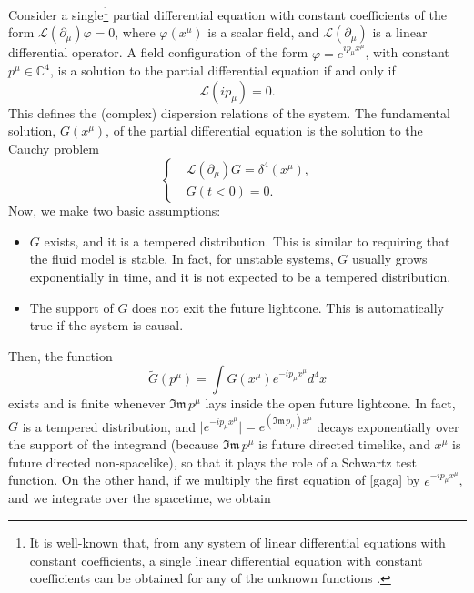 \documentclass[a4paper, amsfonts, amssymb, amsmath, reprint, showkeys, nofootinbib, twoside,notitlepage]{revtex4-1}
\theoremstyle{definition}
\theoremstyle{theorem}
\theoremstyle{corollary}
\begin{document}
Consider a single\footnote{It is well-known that, from any system of linear differential equations with
constant coefficients, a single linear differential equation with constant coefficients can be obtained for any of the unknown functions \cite{CourantHilbert2_book}.} partial differential equation with constant coefficients of the form $\mathcal{L}(\partial_\mu)\varphi=0$, where $\varphi(x^\mu)$ is a scalar field, and $\mathcal{L}(\partial_\mu)$ is a linear differential operator. A field configuration of the form $\varphi=e^{ip_\mu x^\mu}$, with constant $p^\mu \in \mathbb{C}^4$, is a solution to the partial differential equation if and only if
\begin{equation}
\mathcal{L}(ip_\mu)=0.
\end{equation}
This defines the (complex) dispersion relations of the system. The fundamental solution, $G(x^\mu)$, of the partial differential equation is the solution to the Cauchy problem
\begin{equation}\label{gaga}
\left\{ \begin{aligned} 
  & \mathcal{L}(\partial_\mu)G = \delta^4(x^\mu)  , \\
  & G(t<0) = 0 .
\end{aligned} \right.
\end{equation}
Now, we make two basic assumptions:
\begin{itemize}
\item[(a)] $G$ exists, and it is a tempered distribution. This is similar to requiring that the fluid model is stable. In fact, for unstable systems, $G$ usually grows exponentially in time, and it is not expected to be a tempered distribution.
\item[(b)] The support of $G$ does not exit the future lightcone. This is automatically true if the system is causal. 
\end{itemize}
Then, the function
\begin{equation}\label{GGG}
\tilde{G}(p^\mu)= \int G(x^\mu)e^{-ip_\mu x^\mu} d^4 x
\end{equation}
exists and is finite whenever $\mathfrak{Im} \, p^\mu$ lays inside the open future lightcone. In fact, $G$ is a tempered distribution, and $\big|e^{-ip_\mu x^\mu}\big|=e^{(\mathfrak{Im} \, p_\mu) x^\mu}$ decays exponentially over the support of the integrand (because $\mathfrak{Im} \, p^\mu$ is future directed timelike, and $x^\mu$ is future directed non-spacelike), so that it plays the role of a Schwartz test function. On the other hand, if we multiply the first equation of \eqref{gaga} by $e^{-ip_\mu x^\mu}$, and we integrate over the spacetime, we obtain
\end{document}
